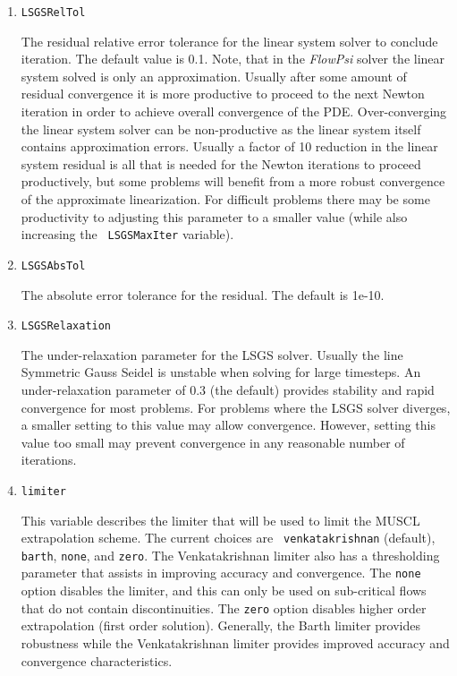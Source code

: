 \documentclass{article}
\begin{document}
\begin{enumerate}
\item {\tt LSGSRelTol} 

  The residual relative error tolerance for the linear system solver
  to conclude iteration.  The default value is 0.1.  Note, that in the
  {\em FlowPsi} solver the linear system solved is only an approximation.
  Usually after some amount of residual convergence it is more
  productive to proceed to the next Newton iteration in order to
  achieve overall convergence of the PDE.  Over-converging the linear
  system solver can be non-productive as the linear system itself
  contains approximation errors.  Usually a factor of 10 reduction in
  the linear system residual is all that is needed for the Newton
  iterations to proceed productively, but some problems will benefit
  from a more robust convergence of the approximate linearization.
  For difficult problems there may be some productivity to adjusting
  this parameter to a smaller value (while also increasing the {\tt
    LSGSMaxIter} variable).

\item {\tt LSGSAbsTol}

  The absolute error tolerance for the residual.  The default is 1e-10.

\item {\tt LSGSRelaxation}

  The under-relaxation parameter for the LSGS solver.  Usually the
  line Symmetric Gauss Seidel is unstable when solving for large
  timesteps.  An under-relaxation parameter of 0.3 (the default)
  provides stability and rapid convergence for most problems.  For
  problems where the LSGS solver diverges, a smaller setting to this
  value may allow convergence.  However, setting this value too small
  may prevent convergence in any reasonable number of iterations.

\item {\tt limiter }

  This variable describes the limiter that will be used to limit the
  MUSCL extrapolation scheme.  The current choices are {\tt
    venkatakrishnan} (default), {\tt barth}, {\tt none}, and {\tt zero}.  
  The Venkatakrishnan limiter also has a thresholding parameter
  that assists in improving accuracy and convergence.  The {\tt none}
  option disables the limiter, and this can only be used on
  sub-critical flows that do not contain discontinuities.  The
  {\tt zero} option disables higher order extrapolation (first order solution).
  Generally, the Barth limiter provides robustness while the Venkatakrishnan
  limiter provides improved accuracy and convergence characteristics.
  

\end{enumerate}
\end{document}
